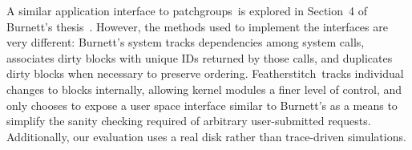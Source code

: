\documentclass[9pt,twocolumn,letterpaper]{article}
\newcommand{\Kudos}{Featherstitch}
\newcommand{\patchgroups}{patchgroups}
\begin{document}
A similar application interface to \patchgroups\ is explored in
Section~4 of Burnett's thesis~\cite{burnett06information}. However, the methods
used to implement the interfaces are very different: Burnett's system tracks
dependencies among system calls, associates dirty blocks with
unique IDs returned by those calls, and duplicates dirty blocks when necessary
to preserve ordering. \Kudos\ tracks individual changes to blocks internally,
allowing kernel modules a finer level of control, and only chooses to expose a
user space interface similar to Burnett's as a means to simplify the sanity
checking required of arbitrary user-submitted requests.
%
Additionally, our evaluation uses a real disk rather than trace-driven
simulations.
\end{document}
